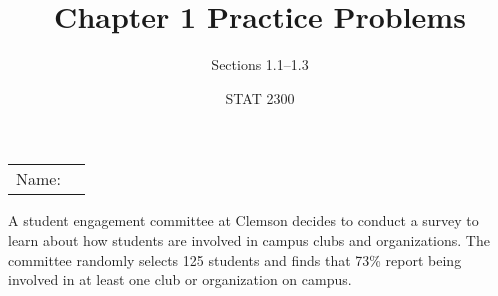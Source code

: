 \documentclass[noanswers]{exam}
\title{Chapter 1 Practice Problems}
\author{Sections 1.1--1.3}
\date{STAT 2300}
\begin{document}
\noindent\begin{tabular}{@{}p{.3in}p{3in}@{}}
Name: & \hrulefill
\end{tabular}


\begin{questions} 

	\question A student engagement committee at Clemson decides to conduct a survey to learn about how students are involved in campus clubs and organizations. The committee randomly selects 125 students and finds that 73\% report being involved in at least one club or organization on campus.
	
	\vspace{5mm}

\end{questions}
\end{document}
